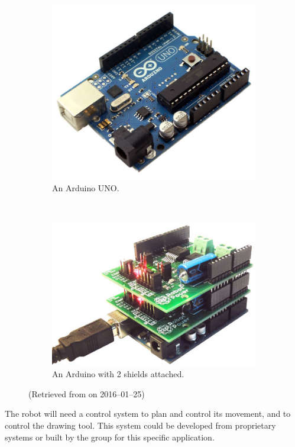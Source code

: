    \label{outline: control}
        \begin{figure}%
            \centering
            \begin{subfigure}[b]{0.45\textwidth}
                \includegraphics[width=\textwidth]{Files/arduino}
                \caption{An Arduino UNO.}
                \label{fig: arduino}
            \end{subfigure}
            ~
            \begin{subfigure}[b]{0.45\textwidth}
                \includegraphics[width=\textwidth]{Files/arduino_with_shields}
                \caption{An Arduino with 2 \glspl{shield} attached.}
                \label{fig: arduino shields}
            \end{subfigure}
            \caption{\small (Retrieved from  on 2016--01--25)}
            \label{fig: arduino and shields}
        \end{figure}
        The robot will need a control system to plan and control its movement, and to control the drawing tool. This system could be developed from proprietary systems or built by the group for this specific application.

